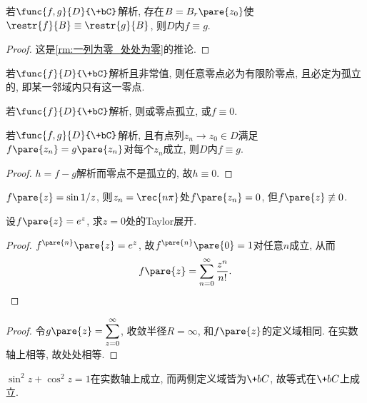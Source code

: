 \documentclass{ctexart}
\begin{document}
\begin{corollary}
    若$\func{f,g}{D}{\+bC}$解析, 存在$B=B_r\pare{z_0}$使$\restr{f}{B} \equiv \restr{g}{B}$, 则$D$内$f\equiv g$.
\end{corollary}
\begin{proof}
    这是\cref{rm:一列为零_处处为零}的推论.
\end{proof}
\begin{corollary}
    若$\func{f}{D}{\+bC}$解析且非常值, 则任意零点必为有限阶零点, 且必定为孤立的, 即某一邻域内只有这一零点.
\end{corollary}
\begin{corollary}
    若$\func{f}{D}{\+bC}$解析, 则或零点孤立, 或$f\equiv 0$.
\end{corollary}
\begin{theorem}[唯一性定理]
    若$\func{f,g}{D}{\+bC}$解析, 且有点列$z_n\rightarrow z_0 \in D$满足$f\pare{z_n} = g\pare{z_n}$对每个$z_n$成立, 则$D$内$f\equiv g$.
\end{theorem}
\begin{proof}
    $h=f-g$解析而零点不是孤立的, 故$h\equiv 0$.
\end{proof}
\begin{sample}
    \begin{ex}
        $f\pare{z} = \sin \displaystyle 1/z$, 则$z_n = \displaystyle \rec{n\pi}$处$f\pare{z_n} = 0$, 但$f\pare{z} \not\equiv 0$.
    \end{ex}
\end{sample}
\begin{sample}
    \begin{ex}
        设$f\pare{z} = e^z$, 求$z=0$处的Taylor展开.
    \end{ex}
    \begin{proof}
        $f^{\pare{n}}\pare{z} = e^z$, 故$f^{\pare{n}}\pare{0} = 1$对任意$n$成立, 从而
        \[ f\pare{z} = \sum_{n=0}^\infty \frac{z^n}{n!}. \qedhere \]
    \end{proof}
    \begin{proof}
        令$g\pare{z} = \displaystyle \sum_{z=0}^\infty$, 收敛半径$R=\infty$, 和$f\pare{z}$的定义域相同. 在实数轴上相等, 故处处相等.
    \end{proof}
\end{sample}
\begin{sample}
    \begin{ex}
        $\sin^2 z + \cos^2 z = 1$在实数轴上成立, 而两侧定义域皆为$\+bC$, 故等式在$\+bC$上成立.
    \end{ex}
\end{sample}
\end{document}
